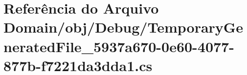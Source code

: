 \hypertarget{Domain_2obj_2Debug_2TemporaryGeneratedFile__5937a670-0e60-4077-877b-f7221da3dda1_8cs}{}\section{Referência do Arquivo Domain/obj/\+Debug/\+Temporary\+Generated\+File\+\_\+5937a670-\/0e60-\/4077-\/877b-\/f7221da3dda1.cs}
\label{Domain_2obj_2Debug_2TemporaryGeneratedFile__5937a670-0e60-4077-877b-f7221da3dda1_8cs}
